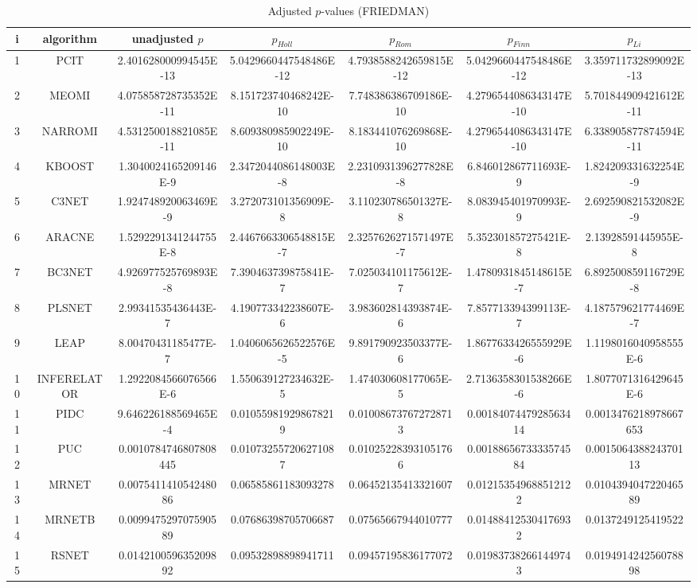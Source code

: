 \documentclass[a4paper,10pt]{article}
\begin{document}
\begin{landscape}
\begin{table}[!htp]
\centering\scriptsize
\caption{Adjusted $p$-values (FRIEDMAN)}
\begin{tabular}{ccccccc}
i&algorithm&unadjusted $p$&$p_{Holl}$&$p_{Rom}$&$p_{Finn}$&$p_{Li}$\\
\hline
1&PCIT&2.401628000994545E-13&5.0429660447548486E-12&4.7938588242659815E-12&5.0429660447548486E-12&3.359711732899092E-13\\
2&MEOMI&4.075858728735352E-11&8.151723740468242E-10&7.748386386709186E-10&4.2796544086343147E-10&5.701844909421612E-11\\
3&NARROMI&4.531250018821085E-11&8.609380985902249E-10&8.183441076269868E-10&4.2796544086343147E-10&6.338905877874594E-11\\
4&KBOOST&1.3040024165209146E-9&2.3472044086148003E-8&2.2310931396277828E-8&6.846012867711693E-9&1.824209331632254E-9\\
5&C3NET&1.924748920063469E-9&3.272073101356909E-8&3.110230786501327E-8&8.083945401970993E-9&2.692590821532082E-9\\
6&ARACNE&1.5292291341244755E-8&2.4467663306548815E-7&2.3257626271571497E-7&5.352301857275421E-8&2.13928591445955E-8\\
7&BC3NET&4.926977525769893E-8&7.390463739875841E-7&7.025034101175612E-7&1.4780931845148615E-7&6.892500859116729E-8\\
8&PLSNET&2.99341535436443E-7&4.190773342238607E-6&3.983602814393874E-6&7.857713394399113E-7&4.187579621774469E-7\\
9&LEAP&8.00470431185477E-7&1.0406065626522576E-5&9.891790923503377E-6&1.8677633426555929E-6&1.1198016040958555E-6\\
10&INFERELATOR&1.2922084566076566E-6&1.550639127234632E-5&1.474030608177065E-5&2.7136358301538266E-6&1.8077071316429645E-6\\
11&PIDC&9.646226188569465E-4&0.010559819298678219&0.010086737672728713&0.0018407447928563414&0.0013476218978667653\\
12&PUC&0.0010784746807808445&0.010732557206271087&0.010252283931051766&0.0018865673333574584&0.001506438824370113\\
13&MRNET&0.007541141054248086&0.06585861183093278&0.06452135413321607&0.012153549688512122&0.010439404722046589\\
14&MRNETB&0.009947529707590589&0.07686398705706687&0.07565667944010777&0.014884125304176932&0.0137249125419522\\
15&RSNET&0.014210059635209892&0.09532898898941711&0.09457195836177072&0.019837382661449743&0.019491424256078898\\

\end{tabular}
\end{table}
\end{landscape}
\end{document}
